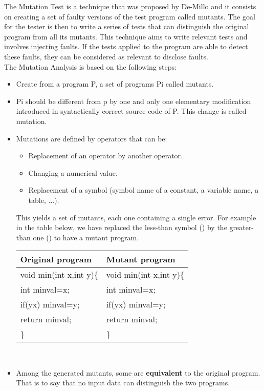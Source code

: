 \documentclass{acm_proc_article-sp}
\begin{document}
The Mutation Test \cite{yve:pas:hel} is a technique that was proposed by De-Millo and it  consists on creating a set of faulty versions of the test program called mutants. The goal for the tester is then to write a series of tests that can distinguish the original program from all its mutants. This technique aims to write relevant tests and involves injecting faults. If the tests applied to the program are able to detect these faults, they can be considered as relevant to disclose faults.\\
The Mutation Analysis is based on the following steps:
\begin{itemize}
 \item Create from a program P, a set of programs Pi called mutants.
 \item Pi should be different from p by one and only one elementary modification introduced in syntactically correct source code of P. This change is called mutation.
 \item Mutations are defined by operators that can be:
 \begin{itemize}
  \item Replacement of an operator by another operator.
  \item Changing a numerical value.
  \item Replacement of a symbol (symbol name of a constant, a variable name, a table, ...).\\
 \end{itemize}
 This yields a set of mutants, each one containing a single error. For example in the table below, we have replaced the less-than symbol () by the greater-than one () to have a mutant program. \\
\begin{center}
\begin{tabular}{|l|l|}
\hline Original program & Mutant program \\
\hline void min(int x,int y)\{ & void min(int x,int y)\{\\
               int minval=x; &   int minval=x; \\
        if(yx) minval=y;  &  if(yx) minval=y;\\
        return minval;  &  return minval;\\
       \} & \}\\ \hline
\end{tabular} \vspace{0.3cm} \\
\end{center}
 \item Among the generated mutants, some are \textbf{equivalent} to the original program. That is to say that no input data can distinguish the two programs.\\

\end{itemize}
\end{document}
